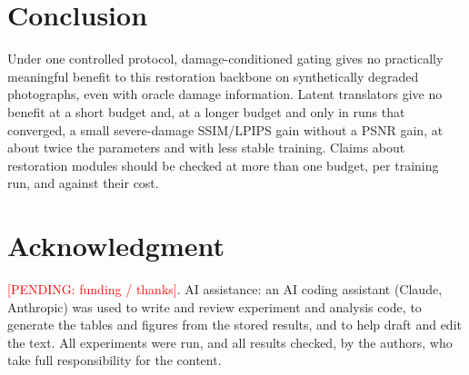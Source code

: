 \documentclass[conference]{IEEEtran}
\newcommand{\pending}[1]{\textcolor{red}{[PENDING: #1]}}
\begin{document}
\section{Conclusion}
Under one controlled protocol, damage-conditioned gating gives no practically meaningful benefit to
this restoration backbone on synthetically degraded photographs, even with oracle damage information. Latent translators give no benefit at a short budget and, at a longer budget
and only in runs that converged, a small severe-damage SSIM/LPIPS gain without a PSNR gain, at about twice the
parameters and with less stable training. Claims about restoration modules should be checked at more than one
budget, per training run, and against their cost.

\section*{Acknowledgment}
\pending{funding / thanks}. AI assistance: an AI coding assistant (Claude, Anthropic) was used to write and review
experiment and analysis code, to generate the tables and figures from the stored results, and to help draft and
edit the text. All experiments were run, and all results checked, by the authors, who take full responsibility for
the content.



\end{document}
